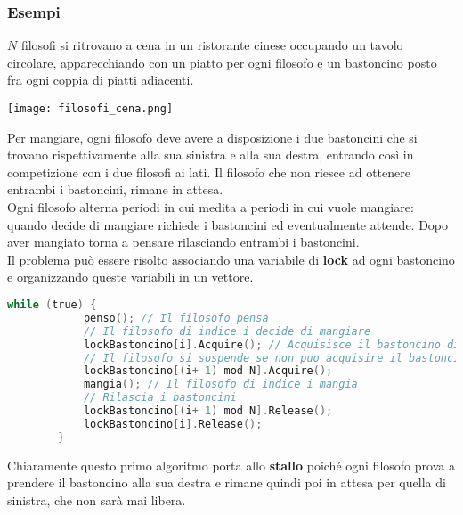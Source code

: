 \subsubsection{Esempi}
\begin{example}
	\label{example:philosophers}
	$N$ filosofi si ritrovano a cena in un ristorante cinese occupando un tavolo circolare, apparecchiando con un piatto per ogni filosofo e un bastoncino posto fra ogni coppia di piatti adiacenti.
	\begin{center}
		\texttt{[image: filosofi\_cena.png]}
	\end{center}
	Per mangiare, ogni filosofo deve avere a disposizione i due bastoncini che si trovano 
	rispettivamente alla sua sinistra e alla sua destra, entrando così in competizione con i due filosofi ai lati. Il filosofo che non riesce ad ottenere entrambi i bastoncini, rimane in attesa.\\
	Ogni filosofo alterna periodi in cui medita a periodi in cui vuole mangiare: quando decide di mangiare richiede i bastoncini ed eventualmente attende. Dopo aver mangiato torna a pensare rilasciando entrambi i bastoncini. \\
	Il problema può essere risolto associando una variabile di \textbf{lock} ad ogni bastoncino e organizzando queste variabili in un vettore. 
	\begin{lstlisting}[language=C]
		while (true) {
			penso(); // Il filosofo pensa
			// Il filosofo di indice i decide di mangiare 
			lockBastoncino[i].Acquire(); // Acquisisce il bastoncino di destra 
			// Il filosofo si sospende se non puo acquisire il bastoncino alla sua sinistra
			lockBastoncino[(i+ 1) mod N].Acquire(); 
			mangia(); // Il filosofo di indice i mangia 
			// Rilascia i bastoncini
			lockBastoncino[(i+ 1) mod N].Release();
			lockBastoncino[i].Release();
		}
	\end{lstlisting}
	Chiaramente questo primo algoritmo porta allo \textbf{stallo} poiché ogni filosofo prova a prendere il bastoncino alla sua destra e rimane quindi poi in attesa per quella di sinistra, che non sarà mai libera.\\


\end{example}
